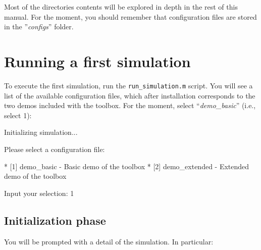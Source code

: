 \noindent Most of the directories contents will be explored in depth in the rest of this manual. For the moment, you should remember that configuration files are stored in the ''\textit{configs}'' folder.

\section{Running a first simulation}

To execute the first simulation, run the \verb|run_simulation.m| script. You will see a list of the available configuration files, which after installation corresponds to the two demos included with the toolbox. For the moment, select ``\textit{demo\_basic}'' (i.e., select 1):

\newpage

\begin{console}
Initializing simulation...

Please select a configuration file:
 
	 * [1] demo_basic - Basic demo of the toolbox 
	 * [2] demo_extended - Extended demo of the toolbox 

Input your selection: 1
\end{console}

\subsection{Initialization phase}

You will be prompted with a detail of the simulation. In particular:

